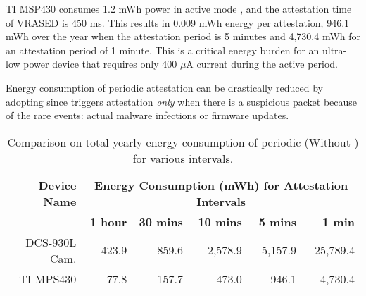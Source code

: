 TI MSP430 consumes 1.2 mWh power in active mode \cite{TI-MSP430-specs}, and the attestation time of VRASED is 450 ms. This results in 0.009 mWh energy per attestation, 946.1 mWh over the year when the attestation period is 5 minutes and 4,730.4 mWh for an attestation period of 1 minute. This is a critical energy burden for an ultra-low power device that requires only 400 $\mu$A current during the active period. 

Energy consumption of periodic attestation can be drastically reduced by adopting \system{} since \system{} triggers attestation \textit{only} when there is a suspicious packet because of the rare events: actual malware infections or firmware updates.
\begin{table}[t!]
	\scriptsize
	\centering
        \caption{Comparison on total yearly energy consumption of periodic \ra{} (Without \system{}) for various intervals.}
	\begin{tabularx}{\linewidth}
{r r r r r r}
  \toprule
  \textbf{Device Name} & \multicolumn{5}{c}{\textbf{Energy Consumption (mWh) for Attestation Intervals}} \\
  \cline{2-6}
  & \textbf{1 hour} & \textbf{30 mins} & \textbf{10 mins} & \textbf{5 mins} & \textbf{1 min}\\
  \midrule
  DCS-930L Cam. & 423.9 & 859.6 & 2,578.9 & 5,157.9 & 25,789.4 \\
  TI MPS430 & 77.8 & 157.7 & 473.0 & 946.1 & 4,730.4\\
  \bottomrule
\end{tabularx}
\vspace{-1em}
\label{tab:attestation energy}
\end{table}